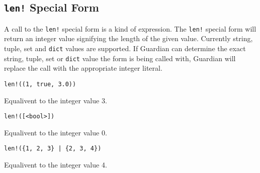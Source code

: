 
\subsection{\texttt{len!} Special Form}
{
	A call to the \texttt{len!} special form is a kind of expression.
	The \texttt{len!} special form will return an integer value signifying
	the length of the given value. Currently string, tuple, set
	and \texttt{dict} values are supported.
	If Guardian can determine the exact string, tuple, set or \texttt{dict}
	value the form is being called with, Guardian will replace the call with
	the appropriate integer literal.
	
	\begin{itemize}
	{
		\item \texttt{len!((1, true, 3.0))}
		
			Equalivent to the integer value 3.
		
		\item \texttt{len!([<bool>])}
		
			Equalivent to the integer value 0.
		
		\item \texttt{len!(\{1, 2, 3\} | \{2, 3, 4\})}
		
			Equalivent to the integer value 4.
	}
	\end{itemize}
}


















